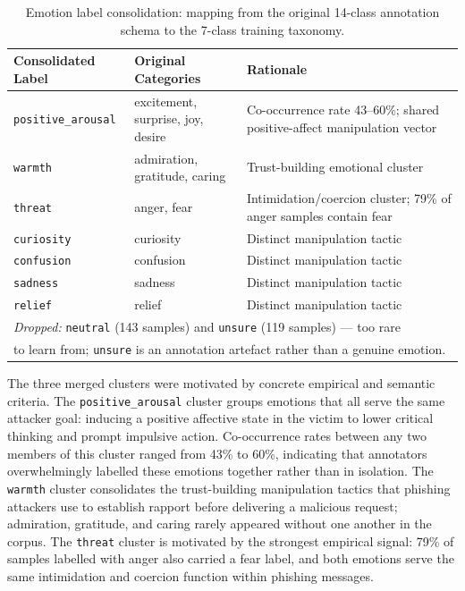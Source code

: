 \begin{table}[htbp]
\centering
\caption[Emotion label consolidation]{Emotion label consolidation: mapping from the original 14-class annotation schema to the 7-class training taxonomy.}
\label{tab:emotion_merging}
\begin{tabular}{lp{4.5cm}p{5.5cm}}
\hline
\textbf{Consolidated Label} & \textbf{Original Categories} & \textbf{Rationale} \\
\hline
\texttt{positive\_arousal} & excitement, surprise, joy, desire & Co-occurrence rate 43–60\%; shared positive-affect manipulation vector \\
\texttt{warmth}            & admiration, gratitude, caring      & Trust-building emotional cluster \\
\texttt{threat}            & anger, fear                        & Intimidation/coercion cluster; 79\% of anger samples contain fear \\
\texttt{curiosity}         & curiosity                          & Distinct manipulation tactic \\
\texttt{confusion}         & confusion                          & Distinct manipulation tactic \\
\texttt{sadness}           & sadness                            & Distinct manipulation tactic \\
\texttt{relief}            & relief                             & Distinct manipulation tactic \\
\hline
\multicolumn{3}{l}{\textit{Dropped:} \texttt{neutral} (143 samples) and \texttt{unsure} (119 samples) — too rare} \\
\multicolumn{3}{l}{to learn from; \texttt{unsure} is an annotation artefact rather than a genuine emotion.} \\
\hline
\end{tabular}
\end{table}

The three merged clusters were motivated by concrete empirical and semantic criteria. The \texttt{positive\_arousal} cluster groups emotions that all serve the same attacker goal: inducing a positive affective state in the victim to lower critical thinking and prompt impulsive action. Co-occurrence rates between any two members of this cluster ranged from 43\% to 60\%, indicating that annotators overwhelmingly labelled these emotions together rather than in isolation. The \texttt{warmth} cluster consolidates the trust-building manipulation tactics that phishing attackers use to establish rapport before delivering a malicious request; admiration, gratitude, and caring rarely appeared without one another in the corpus. The \texttt{threat} cluster is motivated by the strongest empirical signal: 79\% of samples labelled with anger also carried a fear label, and both emotions serve the same intimidation and coercion function within phishing messages.

